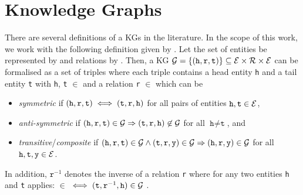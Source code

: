 \section{Knowledge Graphs} 
\label{sec:knowledge_graphs}

There are several definitions of a \acp{KG} in the literature. 
In the scope of this work, we work with the following definition given by \cite{ConEx, RotatE}.
Let the set of entities be represented by \entities and relations by \relations.
Then, a \ac{KG} $\mathcal{G}= \{(\texttt{h}, \texttt{r}, \texttt{t}) \}  \subseteq \mathcal{E} \times \mathcal{R} \times \mathcal{E}$ can be formalised as a set of triples where each triple contains a head entity \texttt{h} and a tail entity \texttt{t} with \texttt{h}, \texttt{t} $\in$ \entities and a relation \texttt{r} $\in$ \relations which can be \cite{ConEx}
\begin{itemize}
    \item 
    \emph{symmetric} if $(\texttt{h}, \texttt{r}, \texttt{t}) \iff (\texttt{t}, \texttt{r}, \texttt{h})$ for all pairs of entities $\texttt{h},\texttt{t}\in \mathcal{E}$, 
   
   \item 
   \emph{anti-symmetric} if $(\texttt{h}, \texttt{r}, \texttt{t}) \in \mathcal{G} \Rightarrow (\texttt{t}, \texttt{r}, \texttt{h}) \not \in \mathcal{G}$ for all $\texttt{h} \not= \texttt{t}$, and
    
    \item 
    \emph{transitive}/\emph{composite} if $(\texttt{h}, \texttt{r}, \texttt{t})\in\mathcal{G} \wedge (\texttt{t}, \texttt{r}, \texttt{y}) \in \mathcal{G}  \Rightarrow (\texttt{h}, \texttt{r}, \texttt{y}) \in \mathcal{G}$ for all $\texttt{h},\texttt{t},\texttt{y}\in \mathcal{E}$.
\end{itemize}
In addition, $\texttt{r}^{-1}$ denotes the inverse of a relation \texttt{r} where for any two entities \texttt{h} and \texttt{t} applies: 
 $\in$ \kg $\iff (\texttt{t},\texttt{r}^{-1},\texttt{h}) \in \mathcal{G}$ \cite{ConEx}.
